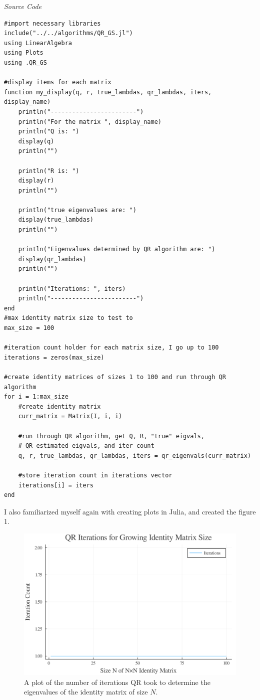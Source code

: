 \documentclass[onecolumn]{webofc}
\begin{document}
\textit{Source Code}
\begin{lstlisting}
#import necessary libraries
include("../../algorithms/QR_GS.jl")
using LinearAlgebra
using Plots
using .QR_GS

#display items for each matrix
function my_display(q, r, true_lambdas, qr_lambdas, iters, display_name)
    println("------------------------")
    println("For the matrix ", display_name)
    println("Q is: ")
    display(q)
    println("")
    
    println("R is: ")
    display(r)
    println("")
    
    println("true eigenvalues are: ")
    display(true_lambdas)
    println("")
    
    println("Eigenvalues determined by QR algorithm are: ")
    display(qr_lambdas)
    println("")

    println("Iterations: ", iters)
    println("------------------------")
end
#max identity matrix size to test to
max_size = 100

#iteration count holder for each matrix size, I go up to 100
iterations = zeros(max_size)

#create identity matrices of sizes 1 to 100 and run through QR algorithm
for i = 1:max_size
    #create identity matrix
    curr_matrix = Matrix(I, i, i)

    #run through QR algorithm, get Q, R, "true" eigvals, 
    # QR estimated eigvals, and iter count
    q, r, true_lambdas, qr_lambdas, iters = qr_eigenvals(curr_matrix)

    #store iteration count in iterations vector
    iterations[i] = iters
end
\end{lstlisting}

I also familiarized myself again with creating plots in Julia, and created the figure 1.

\begin{figure}
\begin{center}
\includegraphics[scale=.055]{graphics/iterations.png}
\caption{A plot of the number of iterations QR took to determine the eigenvalues of the identity matrix of size $N$.}
\end{center}
\end{figure}	
\end{document}
